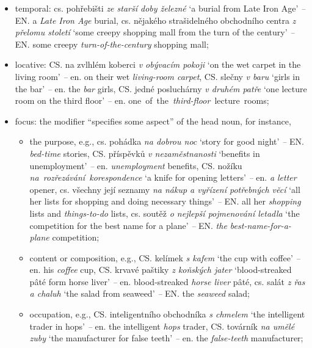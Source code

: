 \documentclass[output=paper]{langscibook}
\begin{document}
\begin{itemize}
\item  temporal: cs. pohřebišti \textit{ze starší doby železné} ‘a burial from Late Iron Age’ \textit{–} EN. a \textit{Late Iron Age} burial, cs. nějakého strašidelného obchodního centra \textit{z přelomu století} ‘some creepy shopping mall from the turn of the century’ \textit{–} EN. some creepy \textit{turn-of-the-century} shopping mall;
\item  locative: CS. na zvlhlém koberci \textit{v obývacím pokoji} ‘on the wet carpet in the living room’ \textit{–} en. on their wet \textit{living-room carpet}, CS. slečny \textit{v baru} ‘girls in the bar’ \textit{–} en. the \textit{bar} girls, CS. jedné posluchárny \textit{v druhém patře} ‘one lecture room on the third floor’ \textit{–} en. one~of~the\textit{~third-floor~}lecture~rooms;
\item  focus: the modifier “specifies some aspect” of the head noun, for instance,
\begin{itemize}
\item the purpose, e.g., cs. pohádka \textit{na dobrou noc} ‘story for good night’ \textit{–} EN. \textit{bed-time} stories, CS. příspěvků \textit{v nezaměstnanosti} ‘benefits in unemployment’ \textit{–} en. \textit{unemployment} benefits, CS. nožíku \textit{na~rozřezávání~korespondence} ‘a knife for opening letters’ \textit{–} en. \textit{a letter} opener, cs. všechny její seznamy \textit{na nákup a vyřízení potřebných věcí} ‘all her lists for shopping and doing necessary things’ \textit{–} EN. all her \textit{shopping} lists and \textit{things-to-do} lists, cs. soutěž \textit{o nejlepší pojmenování letadla} ‘the competition for the best name for a plane’ \textit{–} EN. \textit{the best-name-for-a-plane} competition;
\item  content or composition, e.g., CS. kelímek \textit{s kafem} ‘the cup with coffee’ \textit{–} en. his \textit{coffee} cup, CS. krvavé paštiky \textit{z koňských jater} ‘blood-streaked pâté form horse liver’ \textit{–} en. blood-streaked \textit{horse liver} pâté, cs. salát \textit{z řas a chaluh} ‘the salad from seaweed’ \textit{–} EN. the \textit{seaweed} salad;
\item  occupation, e.g., CS. inteligentního obchodníka \textit{s chmelem} ‘the intelligent trader in hops’ \textit{–} en. the intelligent \textit{hops} trader, CS. továrník \textit{na umělé zuby} ‘the manufacturer for false teeth’ \textit{–} en. the \textit{false-teeth} manufacturer;
\end{itemize}

\end{itemize}
\end{document}
